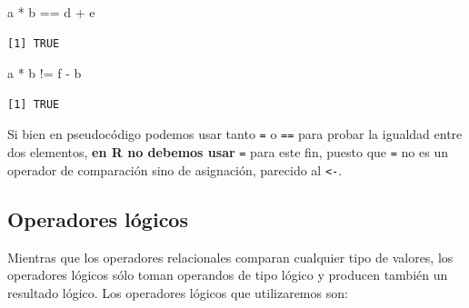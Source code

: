 \documentclass[
]{book}
\newenvironment{Shaded}{\begin{snugshade}}{\end{snugshade}}
\newcommand{\NormalTok}[1]{#1}
\newcommand{\SpecialCharTok}[1]{\textcolor[rgb]{0.00,0.00,0.00}{#1}}
\begin{document}
\begin{Shaded}
\begin{Highlighting}[]
\NormalTok{a }\SpecialCharTok{*}\NormalTok{ b }\SpecialCharTok{==}\NormalTok{ d }\SpecialCharTok{+}\NormalTok{ e}
\end{Highlighting}
\end{Shaded}

\begin{verbatim}
[1] TRUE
\end{verbatim}

\begin{Shaded}
\begin{Highlighting}[]
\NormalTok{a }\SpecialCharTok{*}\NormalTok{ b }\SpecialCharTok{!=}\NormalTok{ f }\SpecialCharTok{{-}}\NormalTok{ b}
\end{Highlighting}
\end{Shaded}

\begin{verbatim}
[1] TRUE
\end{verbatim}

Si bien en pseudocódigo podemos usar tanto \texttt{=} o \texttt{==} para probar la igualdad entre dos elementos, \textbf{en R no debemos usar} \texttt{=} para este fin, puesto que \texttt{=} no es un operador de comparación sino de asignación, parecido al \texttt{\textless{}-}.

\hypertarget{operadores-luxf3gicos}{%
\subsection{Operadores lógicos}\label{operadores-luxf3gicos}}

Mientras que los operadores relacionales comparan cualquier tipo de valores, los operadores lógicos sólo toman operandos de tipo lógico y producen también un resultado lógico. Los operadores lógicos que utilizaremos son:
\end{document}
